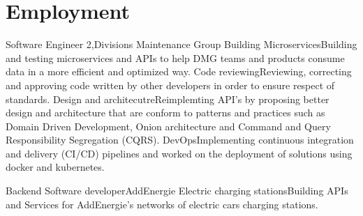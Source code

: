 \section{Employment}
  \resumeSubHeadingListStart
    \resumeSubheading
    {Software Engineer 2,}{Divisions Maintenance Group}{}
    {}
      \resumeItemListStart
        \renewcommand{\labelitemii}{\raisebox{.2cm}{$\bullet$}}
        \resumeItem
        {Building Microservices}{Building and testing microservices and APIs to help DMG teams and products consume data in a more efficient and optimized way.}
        \resumeItem
        {Code reviewing}{Reviewing, correcting and approving code written by other developers in order to ensure respect of standards.}
        \renewcommand{\labelitemii}{\raisebox{.4cm}{$\bullet$}}
        \resumeItem
        {Design and architecutre}{Reimplemting API's by proposing better design and architecture that are conform to patterns and practices such as Domain Driven Development, Onion architecture and Command and Query Responsibility Segregation (CQRS).}
        \renewcommand{\labelitemii}{\raisebox{.2cm}{$\bullet$}}
        \resumeItem
        {DevOps}{Implementing continuous integration and delivery (CI/CD) pipelines and worked on the deployment of solutions using 
        docker and kubernetes.}
        \renewcommand{\labelitemii}{\scriptsize \raisebox{.25cm}{\ding{118}}}
      \resumeItemListEnd

    \resumeSubheading
    {Backend Software developer}{AddEnergie}{}
    {}
      \resumeItemListStart
        \renewcommand{\labelitemii}{\raisebox{.2cm}{$\bullet$}}
        \resumeItem
        {Electric charging stations}{Building APIs and Services for AddEnergie's networks of electric cars charging stations.}
        \renewcommand{\labelitemii}{\scriptsize \raisebox{.25cm}{\ding{118}}}
      \resumeItemListEnd

